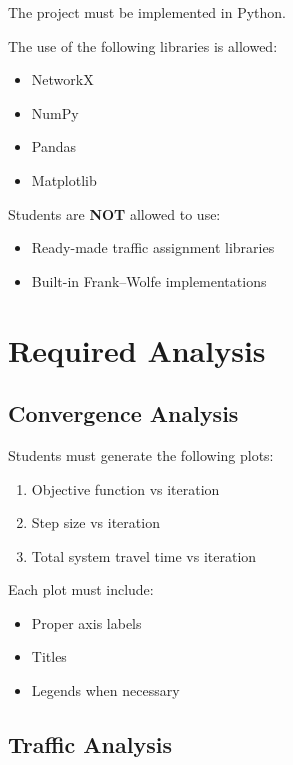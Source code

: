 \documentclass{rapportCS} %
\begin{document}
The project must be implemented in Python.

The use of the following libraries is allowed:

\begin{itemize}
    \item NetworkX
    \item NumPy
    \item Pandas
    \item Matplotlib
\end{itemize}

\vspace{0.5em}

Students are \textbf{NOT} allowed to use:
\begin{itemize}
    \item Ready-made traffic assignment libraries
    \item Built-in Frank--Wolfe implementations
\end{itemize}

\section{Required Analysis}

\subsection{Convergence Analysis}

Students must generate the following plots:

\begin{enumerate}
    \item Objective function vs iteration
    \item Step size vs iteration
    \item Total system travel time vs iteration
\end{enumerate}

Each plot must include:
\begin{itemize}
    \item Proper axis labels
    \item Titles
    \item Legends when necessary
\end{itemize}

\subsection{Traffic Analysis}
\end{document}
